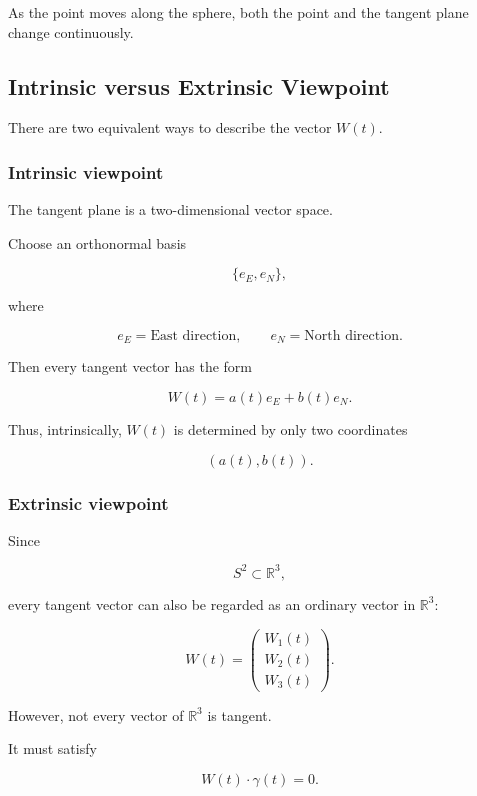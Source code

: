 \documentclass[12pt,a4paper]{article}
\theoremstyle{notespace}
\begin{document}
As the point moves along the sphere, both the point and the tangent plane
change continuously.


\subsection{Intrinsic versus Extrinsic Viewpoint}

There are two equivalent ways to describe the vector \(W(t)\).

\subsubsection*{Intrinsic viewpoint}

The tangent plane is a two-dimensional vector space.

Choose an orthonormal basis

\[
\{e_E,e_N\},
\]

where

\[
e_E
=
\text{East direction},
\qquad
e_N
=
\text{North direction}.
\]

Then every tangent vector has the form

\[
\boxed{
	W(t)
	=
	a(t)e_E+b(t)e_N.
}
\]

Thus, intrinsically, \(W(t)\) is determined by only two coordinates

\[
(a(t),b(t)).
\]


\subsubsection*{Extrinsic viewpoint}

Since

\[
S^2\subset\mathbb R^3,
\]

every tangent vector can also be regarded as an ordinary vector in
\(\mathbb R^3\):

\[
\boxed{
	W(t)
	=
	\begin{pmatrix}
		W_1(t)\\
		W_2(t)\\
		W_3(t)
	\end{pmatrix}.
}
\]

However, not every vector of \(\mathbb R^3\) is tangent.

It must satisfy

\[
\boxed{
	W(t)\cdot\gamma(t)=0.
}
\]
\end{document}
